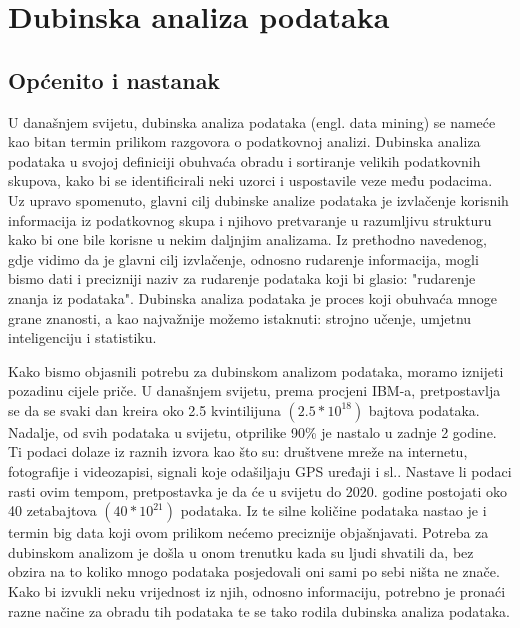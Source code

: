 \documentclass[times, utf8, zavrsni, numeric]{fer}
\begin{document}
\chapter{Dubinska analiza podataka}
\section{Općenito i nastanak}
U današnjem svijetu, dubinska analiza podataka (engl. data mining) se nameće kao bitan termin prilikom razgovora o podatkovnoj analizi. Dubinska analiza podataka u svojoj definiciji obuhvaća obradu i sortiranje velikih podatkovnih skupova, kako bi se identificirali neki uzorci i uspostavile veze među podacima. Uz upravo spomenuto, glavni cilj dubinske analize podataka je izvlačenje korisnih informacija iz podatkovnog skupa i njihovo pretvaranje u razumljivu strukturu kako bi one bile korisne u nekim daljnjim analizama. Iz prethodno navedenog, gdje vidimo da je glavni cilj izvlačenje, odnosno rudarenje informacija, mogli bismo dati i precizniji naziv za rudarenje podataka koji bi glasio: "rudarenje znanja iz podataka". Dubinska analiza podataka je proces koji obuhvaća mnoge grane znanosti, a kao najvažnije možemo istaknuti: strojno učenje, umjetnu inteligenciju i statistiku\cite{SAM:SAM10000}.

Kako bismo objasnili potrebu za dubinskom analizom podataka, moramo iznijeti pozadinu cijele priče. U današnjem svijetu, prema procjeni IBM-a, pretpostavlja se da se svaki dan kreira oko 2.5 kvintilijuna $(2.5*10^{18})$ bajtova podataka\cite{ibm}. Nadalje, od svih podataka u svijetu, otprilike 90\% je nastalo u zadnje 2 godine. Ti podaci dolaze iz raznih izvora kao što su: društvene mreže na internetu, fotografije i videozapisi, signali koje odašiljaju GPS uređaji i sl.. Nastave li podaci rasti ovim tempom,  pretpostavka je da će u svijetu do 2020. godine postojati oko 40 zetabajtova $(40*10^{21})$ podataka. Iz te silne količine podataka nastao je i termin big data koji ovom prilikom nećemo preciznije objašnjavati. Potreba za dubinskom analizom je došla u onom trenutku kada su ljudi shvatili da, bez obzira na to koliko mnogo podataka posjedovali oni sami po sebi ništa ne znače. Kako bi izvukli neku vrijednost iz njih, odnosno informaciju, potrebno je pronaći razne načine za obradu tih podataka te se tako rodila dubinska analiza podataka.	
\end{document}
